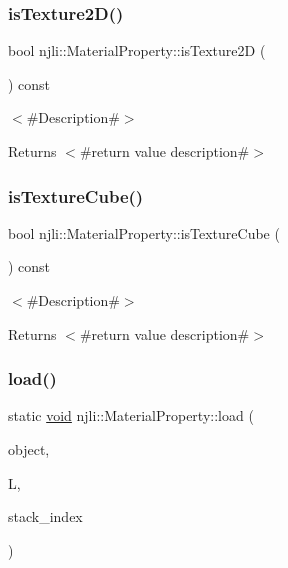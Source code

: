 \subsubsection{\texorpdfstring{is\+Texture2\+D()}{isTexture2D()}}
{\footnotesize\ttfamily bool njli\+::\+Material\+Property\+::is\+Texture2D (\begin{DoxyParamCaption}{ }\end{DoxyParamCaption}) const}

$<$\#\+Description\#$>$

\begin{DoxyReturn}{Returns}
$<$\#return value description\#$>$ 
\end{DoxyReturn}
\mbox{\label{classnjli_1_1_material_property_a80ffe6edad2abff10c36fb54ff7640f6}} 
\subsubsection{\texorpdfstring{is\+Texture\+Cube()}{isTextureCube()}}
{\footnotesize\ttfamily bool njli\+::\+Material\+Property\+::is\+Texture\+Cube (\begin{DoxyParamCaption}{ }\end{DoxyParamCaption}) const}

$<$\#\+Description\#$>$

\begin{DoxyReturn}{Returns}
$<$\#return value description\#$>$ 
\end{DoxyReturn}
\mbox{\label{classnjli_1_1_material_property_a4a3dce836762ad8e911e7965df320b07}} 
\subsubsection{\texorpdfstring{load()}{load()}}
{\footnotesize\ttfamily static \mbox{\hyperlink{_thread_8h_af1e856da2e658414cb2456cb6f7ebc66}{void}} njli\+::\+Material\+Property\+::load (\begin{DoxyParamCaption}\item[{\mbox{\hyperlink{classnjli_1_1_material_property}{Material\+Property}} \&}]{object,  }\item[{lua\+\_\+\+State $\ast$}]{L,  }\item[{int}]{stack\+\_\+index }\end{DoxyParamCaption})\hspace{0.3cm}{\ttfamily [static]}}

